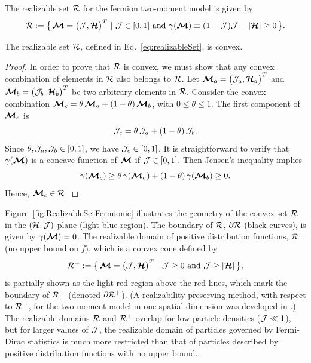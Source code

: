 \begin{define}
  The realizable set $\mathcal{R}$ for the fermion two-moment model is given by
  \begin{equation}
    \mathcal{R}:=\big\{\,\boldsymbol{\mathcal{M}}=\big(\mathcal{J},\boldsymbol{\mathcal{H}}\big)^{T}~|~\mathcal{J}\in[0,1]~\text{and}~\gamma(\boldsymbol{\mathcal{M}})\equiv(1-\mathcal{J})\mathcal{J}-|\boldsymbol{\mathcal{H}}|\ge0\,\big\}.
    \label{eq:realizableSet}
  \end{equation}
\end{define}

\begin{lemma}
  The realizable set $\mathcal{R}$, defined in Eq.~\eqref{eq:realizableSet}, is convex.  
\end{lemma}
\begin{proof}
  In order to prove that $\mathcal{R}$ is convex, we must show that any convex combination of elements in $\mathcal{R}$ also belongs to $\mathcal{R}$.  
  Let $\boldsymbol{\mathcal{M}}_{a}=\big(\mathcal{J}_{a},\boldsymbol{\mathcal{H}}_{a}\big)^{T}$ and $\boldsymbol{\mathcal{M}}_{b}=\big(\mathcal{J}_{b},\boldsymbol{\mathcal{H}}_{b}\big)^{T}$ be two arbitrary elements in $\mathcal{R}$.  
  Consider the convex combination $\boldsymbol{\mathcal{M}}_{c} = \theta\,\boldsymbol{\mathcal{M}}_{a} + (1-\theta)\,\boldsymbol{\mathcal{M}}_{b}$, with $0\leq\theta\leq1$.
  The first component of $\boldsymbol{\mathcal{M}}_{c}$ is
  \begin{equation*}
    \mathcal{J}_{c} = \theta\,\mathcal{J}_{a} + (1-\theta)\,\mathcal{J}_{b}.
  \end{equation*}
  Since $\theta,\mathcal{J}_{a},\mathcal{J}_{b}\in[0,1]$, we have $\mathcal{J}_{c} \in [0,1]$.  
  It is straightforward to verify that $\gamma(\boldsymbol{\mathcal{M}})$ is a concave function of $\boldsymbol{\mathcal{M}}$ if $\mathcal{J}\in[0,1]$.
  Then Jensen's inequality implies
  \begin{equation*}
  \gamma(\boldsymbol{\mathcal{M}}_{c}) \geq \theta\,\gamma(\boldsymbol{\mathcal{M}}_{a}) + (1-\theta)\,\gamma(\boldsymbol{\mathcal{M}}_{b}) \ge0.
  \end{equation*}
  Hence, $\boldsymbol{\mathcal{M}}_{c}\in\mathcal{R}$.
\end{proof}

Figure~\ref{fig:RealizableSetFermionic} illustrates the geometry of the convex set $\mathcal{R}$ in the $(\mathcal{H},\mathcal{J})$-plane (light blue region).  
The boundary of $\mathcal{R}$, $\partial\mathcal{R}$ (black curves), is given by $\gamma(\boldsymbol{\mathcal{M}})=0$.  
The realizable domain of positive distribution functions, $\mathcal{R}^{+}$ (no upper bound on $f$), which is a convex cone defined by
\begin{equation}
  \mathcal{R}^{+}:=\big\{\,\boldsymbol{\mathcal{M}}=\big(\mathcal{J},\boldsymbol{\mathcal{H}}\big)^{T}~|~\mathcal{J}\ge0~\text{and}~\mathcal{J}\ge|\boldsymbol{\mathcal{H}}|\,\big\}, 
  \label{eq:realizableSetPositive}
\end{equation}
is partially shown as the light red region above the red lines, which mark the boundary of $\mathcal{R}^{+}$ (denoted $\partial\mathcal{R}^{+}$).  
(A realizability-preserving method, with respect to $\mathcal{R}^{+}$, for the two-moment model in one spatial dimension was developed in \cite{olbrant_etal_2012}.)  
The realizable domains $\mathcal{R}$ and $\mathcal{R}^{+}$ overlap for low particle densities ($\mathcal{J}\ll1$), but for larger values of $\mathcal{J}$, the realizable domain of particles governed by Fermi-Dirac statistics is much more restricted than that of particles described by positive distribution functions with no upper bound.  

